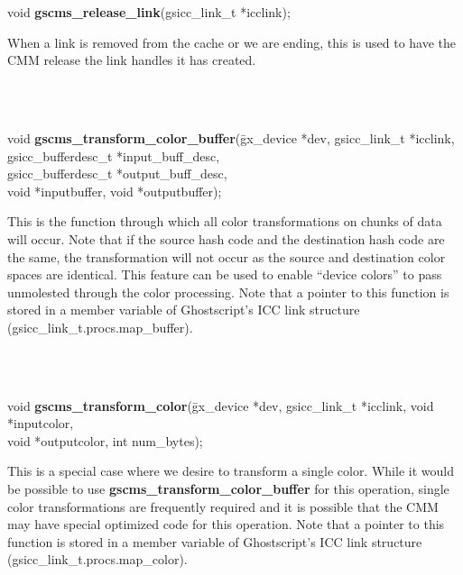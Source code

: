 \documentclass[12pt,notitlepage]{article}
\begin{document}
\noindent void {\bf gscms\_release\_link}(gsicc\_link\_t *icclink);\\

\begin{minipage}[h]{6.0in}
When a link is removed from the cache or we are ending, this is used to have the CMM release the link handles it has created.
\end{minipage}\\
\\

\begin{tabbing}
\noindent void {\bf gscms\_transform\_color\_buffer}(\=gx\_device *dev, gsicc\_link\_t *icclink, \\
\> gsicc\_bufferdesc\_t *input\_buff\_desc,  \\
\> gsicc\_bufferdesc\_t *output\_buff\_desc, \\
\> void *inputbuffer, void *outputbuffer);\\
\end{tabbing}

\begin{minipage}[h]{6.0in}
This is the function through which all color transformations on chunks of data will occur.    Note that if the source hash code and the destination hash code are the same, the transformation will not occur as the source and destination color spaces are identical.  This feature can be used to enable ``device colors'' to pass unmolested through the color processing.  Note that a pointer to this function is stored in a member variable of Ghostscript's ICC link structure (gsicc\_link\_t.procs.map\_buffer).
\end{minipage}\\
\\

\begin{tabbing}
\noindent void {\bf gscms\_transform\_color}(\=gx\_device *dev, gsicc\_link\_t *icclink,  void *inputcolor, \\
\> void *outputcolor, int num\_bytes);\\
\end{tabbing}

\begin{minipage}[h]{6.0in}
This is a special case where we desire to transform a single color.  While it would be possible to use {\bf gscms\_transform\_color\_buffer} for this operation, single color transformations are frequently required and it is possible that the CMM may have special optimized code for this operation.  Note that a pointer to this function is stored in a member variable of Ghostscript's ICC link structure (gsicc\_link\_t.procs.map\_color).
\end{minipage}\\
\\
\end{document}
